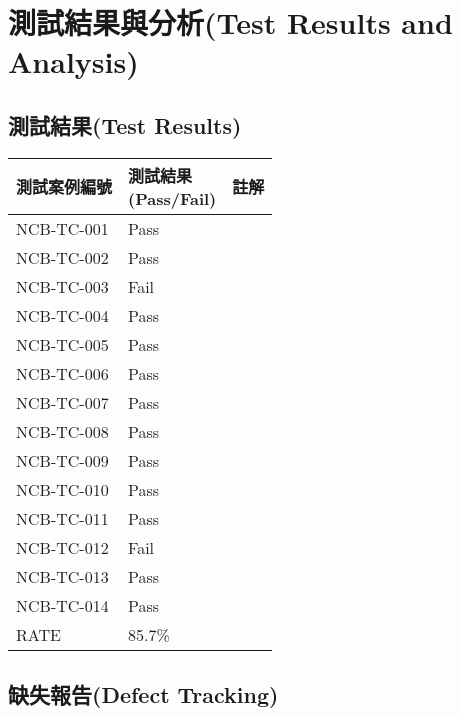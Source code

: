 \documentclass{article}
\begin{document}
\section[測試結果與分析(TEST RESULTS AND ANALYSIS)]{測試結果與分析(Test Results and Analysis)}

\subsection[測試結果(TEST RESULTS)]{測試結果(Test Results)}

\begin{tabularx}{\textwidth}{| m{} | m{} | X |}
	\rowcolor{LightGray}
	\hline
	測試案例編號     & \makecell{測試結果    \\ (Pass/Fail)} & 註解 \\ \hline
	NCB-TC-001 & Pass            & \\ \hline
	NCB-TC-002 & Pass            & \\ \hline
	NCB-TC-003 & \color{red}Fail & \\ \hline
	NCB-TC-004 & Pass            & \\ \hline
	NCB-TC-005 & Pass            & \\ \hline
	NCB-TC-006 & Pass            & \\ \hline
	NCB-TC-007 & Pass            & \\ \hline
	NCB-TC-008 & Pass            & \\ \hline
	NCB-TC-009 & Pass            & \\ \hline
	NCB-TC-010 & Pass            & \\ \hline
	NCB-TC-011 & Pass            & \\ \hline
	NCB-TC-012 & \color{red}Fail & \\ \hline
	NCB-TC-013 & Pass            & \\ \hline
	NCB-TC-014 & Pass            & \\ \hline
	\rowcolor{LightGray}
	RATE       & 85.7\%          & \\ \hline
\end{tabularx}

\subsection[缺失報告(DEFECT TRACKING)]{缺失報告(Defect Tracking)}
\end{document}
